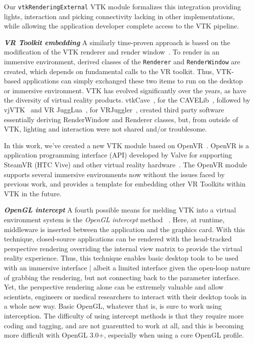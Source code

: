 Our \texttt{vtkRenderingExternal} VTK module formalizes this integration providing lights, interaction and picking connectivity lacking in other implementations, while allowing the application developer complete access to the VTK pipeline.

\textbf{\textit{VR Toolkit embedding}} A similarly time-proven approach is based on the modification of the VTK renderer and render window~\cite{van2000vista, Hannema:2001, Shamonin02vtkcave, Belleman:2003}.
To render in an immersive environment, derived classes of the \texttt{Renderer} and \texttt{RenderWindow} are created, which depends on fundamental calls to the VR toolkit.
Thus, VTK-based applications can simply exchanged these two items to run on the desktop or immersive environment.
VTK has evolved significantly over the years, as have the diversity of virtual reality products.
vtkCave~\cite{Tufo:1999}, for the CAVELib~\cite{CAVELib:2016}, followed by vjVTK~\cite{Blom:2006} and VR JuggLua~\cite{Pavlik:2012}, for VRJuggler~\cite{Bierbaum:2001}, created third party software essentially deriving RenderWindow and Renderer classes, but, from outside of VTK, lighting and interaction were not shared and/or troublesome.

In this work, we've created a new VTK module based on OpenVR~\cite{OpenVR:2016}.
OpenVR is a application programming interface (API) developed by Valve for supporting  SteamVR (HTC Vive) and other virtual reality hardware~\cite{Road2VR:2015}.
The OpenVR module supports several immersive environments now without the issues faced by previous work, and provides a template for embedding other VR Toolkits within VTK in the future.

\textit{\textbf{OpenGL intercept}}
A fourth possible means for melding VTK into a virtual environment system
is the \textit{OpenGL intercept} method
~\cite{Humphreys:2001,Humphreys:2002,Zielinski:2014,TechViz:2016,Conduit:2016}.
Here, at runtime, middleware is inserted between the application and the graphics card.
With this technique, closed-source applications can be rendered with
the head-tracked perspective rendering overriding the internal view matrix
to provide the virtual reality experience.
Thus, this technique enables basic desktop tools to be used with an
immersive interface | albeit a limited interface given the open-loop nature of
grabbing the rendering, but not connecting back to the parameter interface.
Yet, the perspective rendering alone can be extremely valuable and allow
scientists, engineers or medical researchers to interact with their desktop
tools in a whole new way.
Basic OpenGL, whatever that is, is sure to work using interception.
The difficulty of using intercept methods is that they require more coding
and tagging, and are not guarentted to work at all, and this is becoming
more difficult with OpenGL 3.0+, especially when using a core OpenGL profile.

